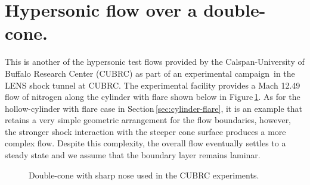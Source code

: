 
\section{Hypersonic flow over a double-cone.}
\label{sec:double-cone-sharp-nose}
%
This is another of the hypersonic test flows provided by the Calspan-University of Buffalo Research Center (CUBRC)
as part of an experimental campaign\,\cite{holden_etal_2002a,holden_wadhams_2003a} in the LENS shock tunnel at CUBRC.
The experimental facility provides a Mach 12.49 flow of nitrogen along the cylinder with flare shown below 
in Figure\,\ref{fig:double-cone-sharp-nose-model}.
As for the hollow-cylinder with flare case in Section\,\ref{sec:cylinder-flare}, 
it is an example that retains a very simple geometric arrangement for the flow boundaries, however, 
the stronger shock interaction with the steeper cone surface produces a more complex flow.
Despite this complexity, the overall flow eventually settles to a steady state and 
we assume that the boundary layer remains laminar.

\begin{figure}[htbp]
 \centering
 \caption{Double-cone with sharp nose used in the CUBRC experiments.}
 \label{fig:double-cone-sharp-nose-model}
\end{figure}

